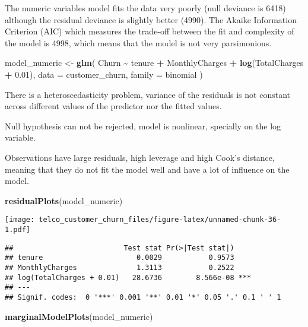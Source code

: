 \documentclass[
  a4paper]{article}
\newenvironment{Shaded}{\begin{snugshade}}{\end{snugshade}}
\newcommand{\AttributeTok}[1]{\textcolor[rgb]{0.13,0.29,0.53}{#1}}
\newcommand{\FloatTok}[1]{\textcolor[rgb]{0.00,0.00,0.81}{#1}}
\newcommand{\FunctionTok}[1]{\textcolor[rgb]{0.13,0.29,0.53}{\textbf{#1}}}
\newcommand{\NormalTok}[1]{#1}
\newcommand{\OtherTok}[1]{\textcolor[rgb]{0.56,0.35,0.01}{#1}}
\newcommand{\SpecialCharTok}[1]{\textcolor[rgb]{0.81,0.36,0.00}{\textbf{#1}}}
\begin{document}
The numeric variables model fits the data very poorly (null deviance is
6418) although the residual deviance is slightly better (4990). The
Akaike Information Criterion (AIC) which measures the trade-off between
the fit and complexity of the model is 4998, which means that the model
is not very parsimonious.

\begin{Shaded}
\begin{Highlighting}[]
\NormalTok{model\_numeric }\OtherTok{\textless{}{-}} \FunctionTok{glm}\NormalTok{(}
\NormalTok{  Churn }\SpecialCharTok{\textasciitilde{}}\NormalTok{ tenure }\SpecialCharTok{+}\NormalTok{ MonthlyCharges }\SpecialCharTok{+} \FunctionTok{log}\NormalTok{(TotalCharges }\SpecialCharTok{+} \FloatTok{0.01}\NormalTok{),}
  \AttributeTok{data =}\NormalTok{ customer\_churn,}
  \AttributeTok{family =}\NormalTok{ binomial}
\NormalTok{)}
\end{Highlighting}
\end{Shaded}

There is a heteroscedasticity problem, variance of the residuals is not
constant across different values of the predictor nor the fitted values.

Null hypothesis can not be rejected, model is nonlinear, specially on
the log variable.

Observations have large residuals, high leverage and high Cook's
distance, meaning that they do not fit the model well and have a lot of
influence on the model.

\begin{Shaded}
\begin{Highlighting}[]
\FunctionTok{residualPlots}\NormalTok{(model\_numeric)}
\end{Highlighting}
\end{Shaded}

\texttt{[image: telco\_customer\_churn\_files/figure-latex/unnamed-chunk-36-1.pdf]}

\begin{verbatim}
##                          Test stat Pr(>|Test stat|)    
## tenure                      0.0029           0.9573    
## MonthlyCharges              1.3113           0.2522    
## log(TotalCharges + 0.01)   28.6736        8.566e-08 ***
## ---
## Signif. codes:  0 '***' 0.001 '**' 0.01 '*' 0.05 '.' 0.1 ' ' 1
\end{verbatim}

\begin{Shaded}
\begin{Highlighting}[]
\FunctionTok{marginalModelPlots}\NormalTok{(model\_numeric)}
\end{Highlighting}
\end{Shaded}
\end{document}
